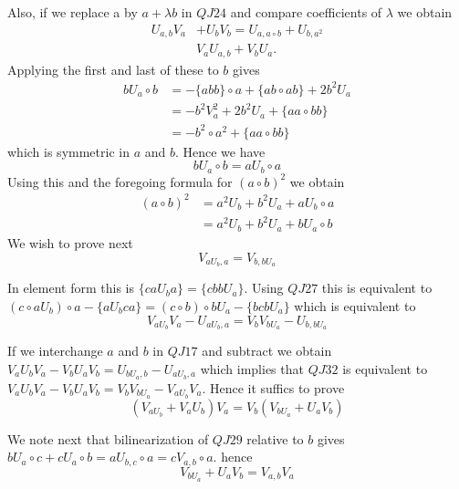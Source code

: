 Also, if we replace a by $a+\lambda b$ in $QJ24$ and compare
coefficients of $\lambda$ we obtain 
\begin{align*}
U_{a,b}V_a&+U_bV_b=U_{a,a\circ b}+U_{b,a^{2}}\\\tag*{QJ28}
&V_aU_{a,b}+V_bU_a.
\end{align*}
Applying the first and last of these to $b$ gives
\begin{align*}
bU_a\circ b&=-\{abb\}\circ a+\{ab\circ ab\}+2b^{2}U_a\\
&=-b^{2}V_a^{2}+2b^{2}U_a+\{aa\circ bb\}\tag*{QJ 26}\\
&=-b^{2}\circ a^{2}+\{aa\circ bb\}\tag*{QJ 20}
\end{align*}
which is symmetric in $a$ and $b$. Hence we have
\begin{equation*}
bU_a\circ b=aU_b\circ a\tag*{QJ29}
\end{equation*}
Using this and the foregoing formula for $(a\circ b)^{2}$ we obtain
\begin{align*}
(a\circ b)^{2}&=a^{2}U_b+b^{2}U_a+aU_b\circ a\tag*{QJ 30}\\
&=a^{2}U_b+b^{2}U_a+bU_a\circ b
\end{align*}\pageoriginale
We wish to prove next
\begin{equation*}
V_{aU_{b},a}=V_{b,bU_{a}}\tag*{QJ 31}
\end{equation*}

In element form this is $\{caU_b a\}=\{cbbU_a\}$. Using $QJ27$ this is
equivalent to $(c \circ a U_b)\circ a-\{a U_b c a\}=(c\circ b)\circ b
U_a-\{b c bU_a\}$ which is equivalent to  
\begin{equation*}
V_{aU_{b}}V_a-U_{aU_{b},a}=V_b V_{bU_{a}}-U_{b,bU_{a}}\tag*{QJ 32}
\end{equation*}

If we interchange $a$ and $b$ in $QJ17$ and subtract we obtain $V_a
U_b V_a-V_b U_aV_b=U_{bU_{a},b}-U_{aU_{b},a}$ which implies that $QJ
32$ is equivalent to $V_a U_b V_a-V_b U_a V_b=V_b
V_{bU_{a}}-V_{aU_{b}} V_a$. Hence it suffics to prove 
\begin{equation*}
(V_{aU_{b}}+V_aU_b)V_a=V_b(V_{bU_{a}}+U_aV_b)\tag*{QJ33}
\end{equation*}

We note next that bilinearization of $QJ 29$ relative to $b$ gives $b
U_a\circ c+c U_a\circ b = aU_{b,c}\circ a=c V_{a,b}\circ a$. hence 
\begin{equation*}
  V_{bU_{a}}+U_aV_b=V_{a,b}V_a\tag*{QJ 34}
\end{equation*}

